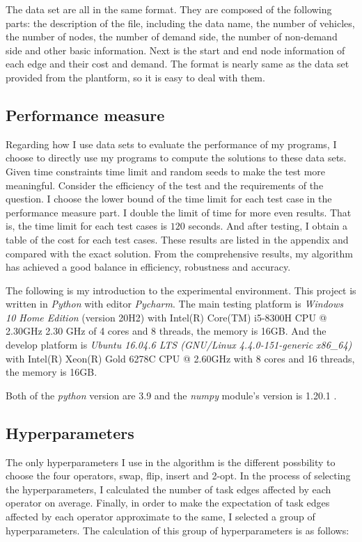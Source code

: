 \documentclass[conference,compsoc]{IEEEtran}
\begin{document}
The data set are all in the same format. They are composed of the following parts: the description of the file, including the data name, the number of vehicles, the number of nodes, the number of demand side, the number of non-demand side and other basic information. Next is the start and end node information of each edge and their cost and demand. The format is nearly same as the data set provided from the plantform, so it is easy to deal with them.

\subsection{Performance measure}
Regarding how I use data sets to evaluate the performance of my programs, I choose to directly use my programs to compute the solutions to these data sets. Given time constraints time limit and random seeds to make the test more meaningful. Consider the efficiency of the test and the requirements of the question. I choose the lower bound of the time limit for each test case in the performance measure part. I double the limit of time for more even results. That is, the time limit for each test cases is $120$ seconds. And after testing, I obtain a table of the cost for each test cases. These results are listed in the appendix and compared with the exact solution. From the comprehensive results, my algorithm has achieved a good balance in efficiency, robustness and accuracy.

The following is my introduction to the experimental environment. This project is written in \emph{Python} with editor \emph{Pycharm}. The main testing platform is \emph{Windows 10 Home Edition} (version 20H2) with Intel(R) Core(TM) i5-8300H CPU @ 2.30GHz 2.30 GHz of 4 cores and 8 threads, the memory is 16GB. And the develop platform is \emph{Ubuntu 16.04.6 LTS (GNU/Linux 4.4.0-151-generic x86\_64)} with Intel(R) Xeon(R) Gold 6278C CPU @ 2.60GHz with 8 cores and 16 threads, the memory is 16GB.

Both of the \emph{python} version are 3.9 and the \emph{numpy} module's version is 1.20.1 .

\subsection{Hyperparameters}
The only hyperparameters I use in the algorithm is the different possbility to choose the four operators, swap, flip, insert and 2-opt. In the process of selecting the hyperparameters, I calculated the number of task edges affected by each operator on average. Finally, in order to make the expectation of task edges affected by each operator approximate to the same, I selected a group of hyperparameters. The calculation of this group of hyperparameters is as follows:
\end{document}
